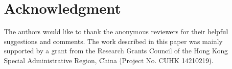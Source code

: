 \section*{Acknowledgment}
\label{s:ack}
The authors would like to thank the anonymous reviewers for their helpful suggestions and comments.
The work described in this paper was mainly supported by a grant from the Research Grants Council of the Hong Kong Special Administrative Region, China (Project No. CUHK 14210219).
